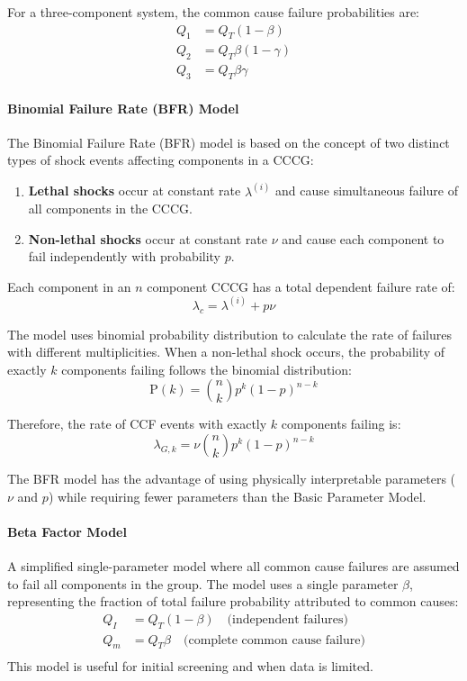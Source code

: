 For a three-component system, the common cause failure probabilities are:
\[
\begin{aligned}
Q_1 &= Q_T(1-\beta) \\
Q_2 &= Q_T\beta(1-\gamma) \\
Q_3 &= Q_T\beta\gamma
\end{aligned}
\]

\paragraph{Binomial Failure Rate (BFR) Model}

The Binomial Failure Rate (BFR) model is based on the concept of two distinct types of shock events affecting components in a CCCG:

\begin{enumerate}
  \item \textbf{Lethal shocks} occur at constant rate $\lambda^{(i)}$ and cause simultaneous failure of all components in the CCCG.
  
  \item \textbf{Non-lethal shocks} occur at constant rate $\nu$ and cause each component to fail independently with probability $p$.
\end{enumerate}

Each component in an $n$ component CCCG has a total dependent failure rate of:
\begin{equation}
\lambda_c = \lambda^{(i)} + p\nu
\end{equation}

The model uses binomial probability distribution to calculate the rate of failures with different multiplicities. When a non-lethal shock occurs, the probability of exactly $k$ components failing follows the binomial distribution:
\begin{equation}
\text{P}(k) = \binom{n}{k}p^k(1-p)^{n-k}
\end{equation}

Therefore, the rate of CCF events with exactly $k$ components failing is:
\begin{equation}
\lambda_{G,k} = \nu\binom{n}{k}p^k(1-p)^{n-k}
\end{equation}

The BFR model has the advantage of using physically interpretable parameters ($\nu$ and $p$) while requiring fewer parameters than the Basic Parameter Model.

\paragraph{Beta Factor Model}
A simplified single-parameter model where all common cause failures are assumed to fail all components in the group. The model uses a single parameter $\beta$, representing the fraction of total failure probability attributed to common causes:
\[
\begin{aligned}
Q_I &= Q_T(1-\beta) \quad \text{(independent failures)} \\
Q_m &= Q_T\beta \quad \text{(complete common cause failure)} \\
\end{aligned}
\]
This model is useful for initial screening and when data is limited.

